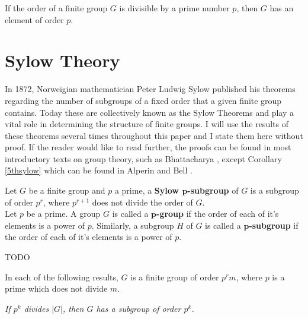 \vspace{-10mm}

\begin{theorem}
    \label{cauchy} If the order of a finite group $G$ is divisible by a prime number $p$, then $G$ has an element of order $p$. \\
\end{theorem} 

\section{Sylow Theory}

In 1872, Norweigian mathematician Peter Ludwig Sylow published his theorems regarding the number of subgroups of a fixed order that a given finite group contains. Today these are collectively known as the Sylow Theorems and play a vital role in determining the structure of finite groups. I will use the results of these theorems several times throughout this paper and I state them here without proof. If the reader would like to read further, the proofs can be found in most introductory texts on group theory, such as Bhattacharya \cite{bhattacharya}, except Corollary \ref{5thsylow} which can be found in Alperin and Bell \cite[p.64]{alperin} . \\


\begin{definition}
Let $G$ be a finite group and $p$ a prime, a \textbf{Sylow $\pmb{p}$-subgroup} of $G$ is a subgroup of order $p^r$, where $p^{r+1}$ does not divide the order of $G$. \\

Let $p$ be a prime. A group $G$ is called a \textbf{$\pmb{p}$-group} if the order of each of it's elements is a power of $p$. Similarly, a subgroup $H$ of $G$ is called a \textbf{$\pmb{p}$-subgroup} if the order of each of it's elements is a power of $p$.
\end{definition}

\begin{remark}
    TODO

\end{remark}

In each of the following results, $G$ is a finite group of order $p^r m$, where $p$ is a prime which does not divide $m$. \\


\begin{theorem}
    \label{Sylow.exists_subgroup_card_pow_prime}
\textit{If $p^k$ divides $|G|$, then $G$ has a subgroup of order $p^k$.} \\

\end{theorem}


